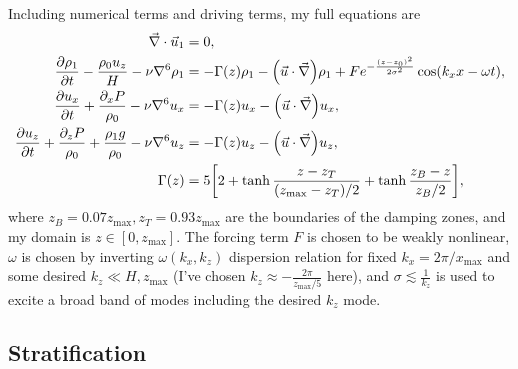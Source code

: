 \documentclass[11pt,
        usenames, %
        dvipsnames %
    ]{article}
\newcommand*{\pd}[2]{\frac{\partial#1}{\partial#2}}
\DeclarePairedDelimiter\p{\lparen}{\rparen}
\DeclarePairedDelimiter\s{\lbrack}{\rbrack}
\begin{document}
Including numerical terms and driving terms, my full equations are
\begin{subequations}\label{se:bouss_num}
    \begin{align}
        \vec{\nabla} \cdot \vec{u}_1 &= 0,\\
        \pd{\rho_1}{t} - \frac{\rho_0 u_z}{H}
            - \nu \nabla^6 \rho_1
            &= -\Gamma(z) \rho_1
                - \p*{\vec{u} \cdot \vec{\nabla}}\rho_1
                + Fe^{-\frac{(z - z_0)^2}{2\sigma^2}}
                    \cos \p*{k_xx - \omega t},\\
        \pd{u_x}{t} + \frac{\partial_x P}{\rho_0}
            - \nu \nabla^6 u_x
            &= -\Gamma(z) u_x
                - \p*{\vec{u} \cdot \vec{\nabla}}u_x,\\
        \pd{u_z}{t} + \frac{\partial_z P}{\rho_0}
            + \frac{\rho_1 g}{\rho_0}
            - \nu \nabla^6 u_z
            &= -\Gamma(z) u_z
                - \p*{\vec{u} \cdot \vec{\nabla}}u_z,\\
        \Gamma(z) &= 5\s*{2 + \tanh \frac{z - z_T}{(z_{\max} - z_T) / 2}
            + \tanh \frac{z_B - z}{z_B / 2}},
    \end{align}
\end{subequations}
where $z_B = 0.07z_{\max}, z_T = 0.93z_{\max}$ are the boundaries of the damping
zones, and my domain is $z \in [0, z_{\max}]$. The forcing term $F$ is chosen to
be weakly nonlinear, $\omega$ is chosen by inverting $\omega(k_x, k_z)$
dispersion relation for fixed $k_x = 2\pi / x_{\max}$ and some desired $k_z \ll
H, z_{\max}$ (I've chosen $k_z \approx -\frac{2\pi}{z_{\max} / 5}$ here), and
$\sigma \lesssim \frac{1}{k_z}$ is used to excite a broad band of modes
including the desired $k_z$ mode.

\subsection{Stratification}
\end{document}

